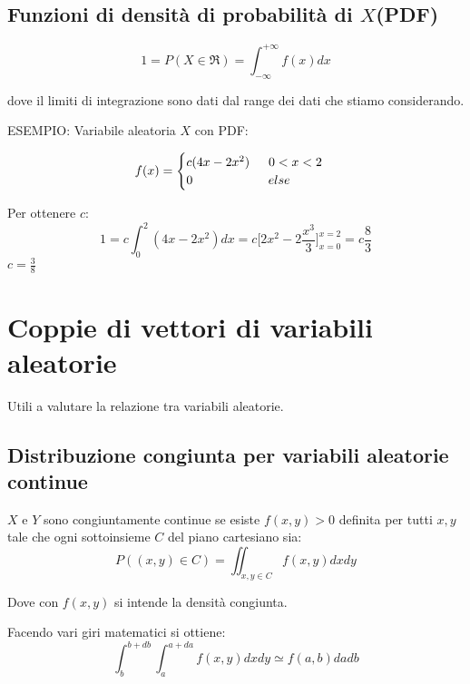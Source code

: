 \subsection{Funzioni di densit\`{a} di probabilit\`{a} di $X$(PDF)}

\begin{equation}
    1 = P(X \in \Re) = \displaystyle\int_{-\infty}^{+\infty} f(x)dx
\end{equation}

dove il limiti di integrazione sono dati dal range dei dati che stiamo considerando. 


ESEMPIO:
Variabile aleatoria $X$ con PDF:

\begin{equation}
    f(x) = \begin{cases}
        c(4x - 2x^2) \indent  0 < x < 2 \\
        0 \indent \indent \indent \indent else
    \end{cases}
\end{equation}

Per ottenere $c$:
\begin{equation}
    1 = c \displaystyle\int_{0}^{2} (4x - 2x^2)dx = c\Bigg[2x^2 - 2\displaystyle\frac{x^3}{3}\Bigg]_{x=0}^{x=2} = c \displaystyle\frac{8}{3}
\end{equation}
$c = \displaystyle\frac{3}{8}$

\section{Coppie di vettori di variabili aleatorie}


Utili a valutare la relazione tra variabili aleatorie. 

\subsection{Distribuzione congiunta per variabili aleatorie continue}


$X$ e $Y$ sono congiuntamente continue se esiste $f(x,y) > 0$ definita per tutti 
$x,y$ tale che ogni sottoinsieme $C$ del piano cartesiano sia:
\begin{equation}
   P((x, y) \in C) = \iint_{x,y \in C} f(x, y)dxdy
\end{equation}

Dove con $f(x, y)$ si intende la densit\`{a} congiunta. 


Facendo vari giri matematici si ottiene:
\begin{equation}
   \displaystyle\int_{b}^{b + db}\displaystyle\int_{a}^{a + da} f(x, y)dxdy \simeq f(a, b)dadb 
\end{equation}

